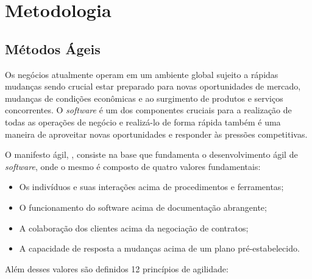\chapter{Metodologia}

\section{Métodos Ágeis}
Os negócios atualmente operam em um ambiente global sujeito a rápidas mudanças sendo crucial
estar preparado para novas oportunidades de mercado, mudanças de condições econômicas e ao surgimento
de produtos e serviços concorrentes. O \textit{software} é um dos componentes cruciais para a realização
de todas as operações de negócio e realizá-lo de forma rápida também é uma maneira de aproveitar novas
oportunidades e responder às pressões competitivas. \cite{sommerville_2006}

O manifesto ágil, \cite{beck2001agile}, consiste na base que fundamenta o desenvolvimento ágil de
\textit{software}, onde o mesmo é composto de quatro valores fundamentais:

\begin{itemize}
    \item Os indivíduos e suas interações acima de procedimentos e ferramentas;
    \item O funcionamento do software acima de documentação abrangente;
    \item A colaboração dos clientes acima da negociação de contratos;
    \item A capacidade de resposta a mudanças acima de um plano pré-estabelecido.
\end{itemize}

Além desses valores são definidos 12 princípios de agilidade:

